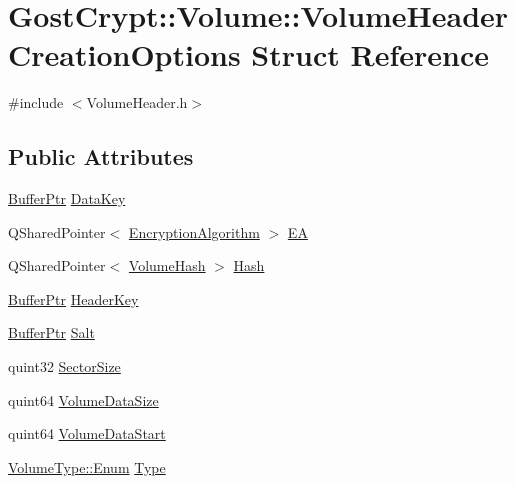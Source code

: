\hypertarget{struct_gost_crypt_1_1_volume_1_1_volume_header_creation_options}{}\section{Gost\+Crypt\+:\+:Volume\+:\+:Volume\+Header\+Creation\+Options Struct Reference}
\label{struct_gost_crypt_1_1_volume_1_1_volume_header_creation_options}


{\ttfamily \#include $<$Volume\+Header.\+h$>$}

\subsection*{Public Attributes}
\begin{DoxyCompactItemize}
\item 
\hyperlink{class_gost_crypt_1_1_buffer_ptr}{Buffer\+Ptr} \hyperlink{struct_gost_crypt_1_1_volume_1_1_volume_header_creation_options_a21b2d1f5c67cef0716acbfd7da3faffd}{Data\+Key}
\item 
Q\+Shared\+Pointer$<$ \hyperlink{class_gost_crypt_1_1_volume_1_1_encryption_algorithm}{Encryption\+Algorithm} $>$ \hyperlink{struct_gost_crypt_1_1_volume_1_1_volume_header_creation_options_a9e4582e49c53035ff58a277abaa6e74a}{EA}
\item 
Q\+Shared\+Pointer$<$ \hyperlink{class_gost_crypt_1_1_volume_1_1_volume_hash}{Volume\+Hash} $>$ \hyperlink{struct_gost_crypt_1_1_volume_1_1_volume_header_creation_options_afb1cee5f167353e3307221836964403e}{Hash}
\item 
\hyperlink{class_gost_crypt_1_1_buffer_ptr}{Buffer\+Ptr} \hyperlink{struct_gost_crypt_1_1_volume_1_1_volume_header_creation_options_a8f2a0874deeec3715038b77e05afd07f}{Header\+Key}
\item 
\hyperlink{class_gost_crypt_1_1_buffer_ptr}{Buffer\+Ptr} \hyperlink{struct_gost_crypt_1_1_volume_1_1_volume_header_creation_options_ad244df06251f5eaae1f17c1572bb2f74}{Salt}
\item 
quint32 \hyperlink{struct_gost_crypt_1_1_volume_1_1_volume_header_creation_options_abe9f97109754fc844e9193e4ebd76571}{Sector\+Size}
\item 
quint64 \hyperlink{struct_gost_crypt_1_1_volume_1_1_volume_header_creation_options_a218c585ba501579a88dbefe8126567ca}{Volume\+Data\+Size}
\item 
quint64 \hyperlink{struct_gost_crypt_1_1_volume_1_1_volume_header_creation_options_ae93d657c6382d9fe4a6bbcd44578abe3}{Volume\+Data\+Start}
\item 
\hyperlink{struct_gost_crypt_1_1_volume_1_1_volume_type_a7fe1979dab76d4534dcb1e26179d4717}{Volume\+Type\+::\+Enum} \hyperlink{struct_gost_crypt_1_1_volume_1_1_volume_header_creation_options_aa1d8f2e018ae92a7fd928b18b494de53}{Type}
\end{DoxyCompactItemize}


